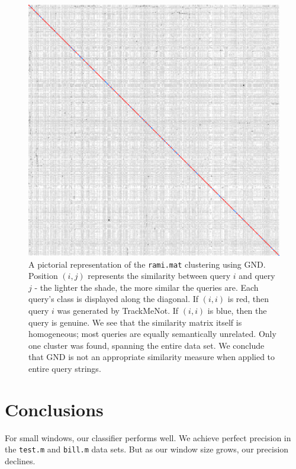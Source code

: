 \documentclass[11pt]{article}
\begin{document}
\begin{multicols}{2}
  \begin{figure}[h]
    \centering
    \includegraphics[width=\linewidth]{ngd_rami_305.pdf}
    \caption{A pictorial representation of the \texttt{rami.mat}
      clustering using GND. Position $(i,j)$ represents the similarity
      between query $i$ and query $j$ - the lighter the shade, the
      more similar the queries are. Each query's class is displayed
      along the diagonal. If $(i,i)$ is red, then query $i$ was
      generated by TrackMeNot. If $(i,i)$ is blue, then the query is
      genuine. We see that the similarity matrix itself is
      homogeneous; most queries are equally semantically
      unrelated. Only one cluster was found, spanning the entire data
      set. We conclude that GND is not an appropriate similarity
      measure when applied to entire query strings.}
    \label{fig:rami.ngd}
  \end{figure}

\section{Conclusions}
\label{sec:conc}

For small windows, our classifier performs well. We achieve perfect
precision in the \texttt{test.m} and \texttt{bill.m} data sets. But as
our window size grows, our precision declines. 


\end{multicols}
\end{document}

